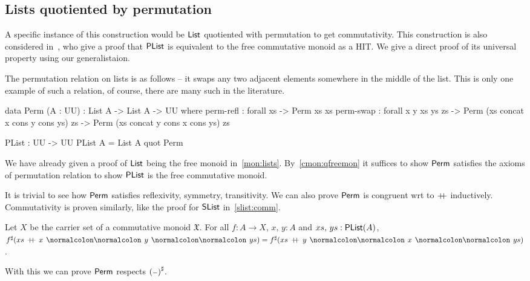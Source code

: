 \subsection{Lists quotiented by permutation}\label{cmon:plist}

A specific instance of this construction would be $\operatorname{\mathsf{List}}$ quotiented with permutation to get commutativity. This
construction is also considered in~\cite{joramConstructiveFinalSemantics2023}, who give a proof that $\operatorname{\mathsf{PList}}$ is
equivalent to the free commutative monoid as a HIT. We give a direct proof of its universal property using our
generalistaion.

The permutation relation on lists is as follows -- it swaps any two adjacent elements somewhere in the middle of the list.
This is only one example of such a relation, of course, there are many such in the literature.
\begin{definition}[PList]
    \leavevmode
    \begin{code}
data Perm (A : UU) : List A -> List A -> UU where
  perm-refl : forall {xs} -> Perm xs xs
  perm-swap : forall {x y xs ys zs}
           -> Perm (xs concat x cons y cons ys) zs
           -> Perm (xs concat y cons x cons ys) zs

PList : UU -> UU
PList A = List A quot Perm
    \end{code}
\end{definition}

We have already given a proof of $\operatorname{\mathsf{List}}$ being the free monoid in~\cref{mon:lists}.
By~\cref{cmon:qfreemon} it suffices to show $\operatorname{\mathsf{Perm}}$ satisfies the axioms of permutation relation
to show $\operatorname{\mathsf{PList}}$ is the free commutative monoid.

It is trivial to see how $\operatorname{\mathsf{Perm}}$ satisfies reflexivity, symmetry, transitivity.
We can also prove $\operatorname{\mathsf{Perm}}$ is congruent wrt to $\mathbin{+\kern -0.4em+}$ inductively.
Commutativity is proven similarly, like the proof for $\operatorname{\mathsf{SList}}$ in~\cref{slist:comm}.

\begin{proposition}\label{plist:sharp-sat}
    Let $X$ be the carrier set of a commutative monoid $\mathfrak{X}$.
    For all $f : A \to X$, $x, \, y : A$ and $xs, \, ys : \operatorname{\mathsf{PList}}(A)$,
    $\ext{f}(xs\,\concat\,x \cons y \cons ys) = \ext{f}(xs\,\concat\,y \cons x \cons ys)$.
\end{proposition}

With this we can prove $\operatorname{\mathsf{Perm}}$ respects $\ext{(\blank)}$.

